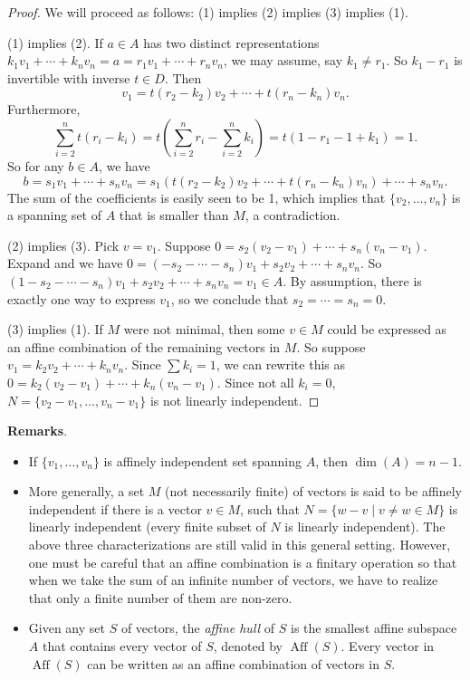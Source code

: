 \documentclass[12pt]{article}
\begin{document}
\begin{proof}
We will proceed as follows: (1) implies (2) implies (3) implies (1).

(1) implies (2).  If $a\in A$ has two distinct representations $k_1v_1+\cdots+k_nv_n=a= r_1v_1+\cdots+r_nv_n$, we may assume, say $k_1\neq r_1$.  So $k_1-r_1$ is invertible with inverse $t\in D$.  Then 
$$v_1=t(r_2-k_2)v_2+\cdots+t(r_n-k_n)v_n.$$  
Furthermore, 
$$\sum_{i=2}^n t(r_i-k_i)=t(\sum_{i=2}^n r_i-\sum_{i=2}^n k_i)=t(1-r_1-1+k_1)=1.$$  So for any $b\in A$, we have 
$$b=s_1v_1+\cdots+s_nv_n=s_1(t(r_2-k_2)v_2+\cdots+t(r_n-k_n)v_n)+\cdots+s_nv_n.$$  The sum of the coefficients is easily seen to be 1, which implies that $\lbrace v_2,\ldots,v_n\rbrace$ is a spanning set of $A$ that is smaller than $M$, a contradiction.

(2) implies (3).  Pick $v=v_1$.  Suppose $0=s_2(v_2-v_1)+\cdots+s_n(v_n-v_1)$.  Expand and we have $0=(-s_2-\cdots-s_n)v_1+s_2v_2+\cdots+s_nv_n$.  So $(1-s_2-\cdots-s_n)v_1+s_2v_2+\cdots+s_nv_n=v_1\in A$.  By assumption, there is exactly one way to express $v_1$, so we conclude that $s_2=\cdots=s_n=0$.

(3) implies (1).  If $M$ were not minimal, then some $v\in M$ could be expressed as an affine combination of the remaining vectors in $M$.  So suppose $v_1=k_2v_2+\cdots+k_nv_n$.  Since $\sum k_i=1$, we can rewrite this as $0=k_2(v_2-v_1)+\cdots+k_n(v_n-v_1)$.  Since not all $k_i=0$, $N=\lbrace v_2-v_1,\ldots, v_n-v_1\rbrace$ is not linearly independent.
\end{proof}

\textbf{Remarks}.
\begin{itemize}
\item
If $\lbrace v_1,\ldots,v_n\rbrace$ is affinely independent set spanning $A$, then $\operatorname{dim}(A)=n-1$.
\item
More generally, a set $M$ (not necessarily finite) of vectors is said to be affinely independent if there is a vector $v\in M$, such that $N=\lbrace w-v\mid v\neq w\in M\rbrace$ is linearly independent (every finite subset of $N$ is linearly independent).  The above three characterizations are still valid in this general setting.  However, one must be careful that an affine combination is a finitary operation so that when we take the sum of an infinite number of vectors, we have to realize that only a finite number of them are non-zero.
\item 
Given any set $S$ of vectors, the \emph{affine hull} of $S$ is the smallest affine subspace $A$ that contains every vector of $S$, denoted by $\operatorname{Aff}(S)$.  Every vector in $\operatorname{Aff}(S)$ can be written as an affine combination of vectors in $S$.
\end{itemize}
\end{document}
